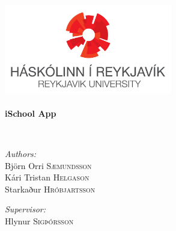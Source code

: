 \begin{titlepage}
\begin{center}


~\\
~\\
~\\
~\\
~\\

\includegraphics[width=0.55\textwidth]{RUheader.png}~\\[1cm]


\color{dark-gray-Large}\HRule \\[0.4cm]
{ \huge \bfseries \color{dark-gray-Large}iSchool App \\[0.4cm] }

\HRule \\[1.5cm]

\noindent
\begin{minipage}{0.4\textwidth}
\begin{flushleft} \large
\emph{\color{dark-gray}Authors:}\\
\color{dark-gray}Björn Orri \textsc{Sæmundsson}\\
Kári Tristan \textsc{Helgason}\\
Starkaður \textsc{Hróbjartsson}\\
\end{flushleft}
\end{minipage}%
\begin{minipage}{0.4\textwidth}
\begin{flushright} \large
\emph{\color{dark-gray}Supervisor:} \\
\color{dark-gray}Hlynur \textsc{Sigþórsson}
\end{flushright}
\end{minipage}

~\\
~\\
~\\


\end{center}
\end{titlepage}
